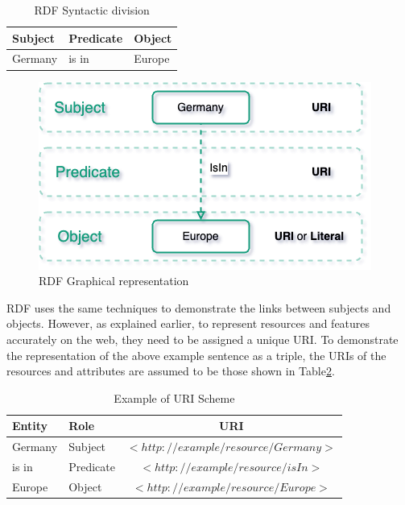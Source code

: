     \begin{table}[h]
        \centering
	    \begin{tabular}{ | m{4cm} | m{4cm} | m{4cm} | }
            \hline
            \rowcolor{teal!30} Subject & Predicate & Object \\
            
            \hline
            Germany  & is in & Europe\\
            
            \hline
        \end{tabular}
        \caption{\label{tab:rdf-example} RDF Syntactic division}
        \end{table}
        
    \begin{figure}[h]
        \centering
        \includegraphics[scale=0.6]{images/Foundation-RDF Example.drawio.png}
        \caption{\label{fig:rdf-example}  RDF Graphical representation}
    \end{figure}

    RDF uses the same techniques to demonstrate the links between subjects and objects. However, as explained earlier, to represent resources and features accurately on the web, they need to be assigned a unique URI. To demonstrate the representation of the above example sentence as a triple, the URIs of the resources and attributes are assumed to be those shown in Table\ref{tab:rdf-example-uri}.
    
    \begin{table}[h]
        \centering
	    {
	    \begin{tabular}{ | m{2.5cm} | m{2.5cm} | c | }
            \hline
            \rowcolor{teal!30} Entity & Role & URI \\
            
            \hline
            Germany  & Subject & $<http://example/resource/Germany>$\\
            
            \hline
            is in  & Predicate & $<http://example/resource/isIn>$\\
            
            \hline
            Europe  & Object & $<http://example/resource/Europe>$\\
            
            \hline
        \end{tabular}}
        \caption{\label{tab:rdf-example-uri} Example of URI Scheme}
    \end{table}

